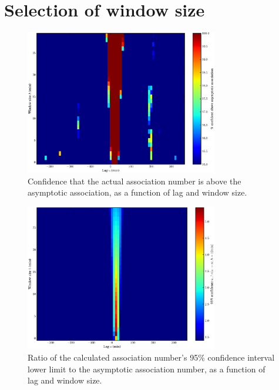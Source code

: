 \documentclass[letterpaper,11pt]{article}
\begin{document}
\section{Selection of window size}
\label{sec:window}
\begin{figure}
\begin{center}
\includegraphics[width=0.75\textwidth]{figures/winsearch_conf.eps}
\caption{\label{fig:window_confidence}Confidence that the actual association
number is above the asymptotic association, as a function of lag and window
size.}
\end{center}
\end{figure}

\begin{figure}
\begin{center}
\includegraphics[width=0.75\textwidth]{figures/winsearch_ratio.eps}
\caption{\label{fig:window_ratio}Ratio of the calculated association
number's 95\% confidence interval lower limit to the asymptotic
association number, as a function of lag and window size.}
\end{center}
\end{figure}
\end{document}
